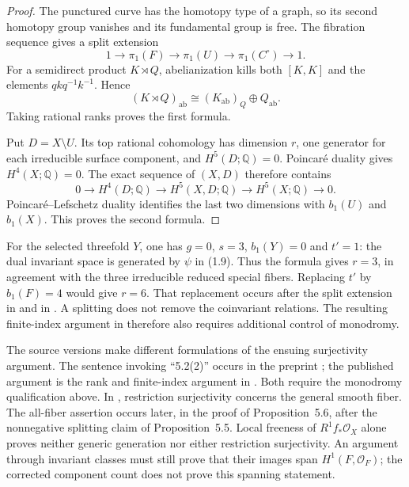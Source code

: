 \documentclass[11pt]{article}
\numberwithin{equation}{section}
\begin{document}
\begin{proof}
The punctured curve has the homotopy type of a graph, so its second
homotopy group vanishes and its fundamental group is free. The
fibration sequence gives a split extension
\[
 1\longrightarrow\pi_1(F)\longrightarrow\pi_1(U)
 \longrightarrow\pi_1(C^\circ)\longrightarrow1.
\]
For a semidirect product $K\rtimes Q$, abelianization kills both
$[K,K]$ and the elements $qkq^{-1}k^{-1}$. Hence
\[
 (K\rtimes Q)_{\mathrm{ab}}
   \cong (K_{\mathrm{ab}})_Q\oplus Q_{\mathrm{ab}}.
\]
Taking rational ranks proves the first formula.

Put $D=X\setminus U$. Its top rational cohomology has dimension
$r$, one generator for each irreducible surface component, and
$H^5(D;\mathbb Q)=0$. Poincar\'e duality gives $H^4(X;\mathbb Q)=0$.
The exact sequence of $(X,D)$ therefore contains
\[
 0\longrightarrow H^4(D;\mathbb Q)
 \longrightarrow H^5(X,D;\mathbb Q)
 \longrightarrow H^5(X;\mathbb Q)\longrightarrow0.
\]
Poincar\'e--Lefschetz duality identifies the last two dimensions with
$b_1(U)$ and $b_1(X)$. This proves the second formula.
\end{proof}

For the selected threefold $Y$, one has $g=0$, $s=3$, $b_1(Y)=0$
and $t'=1$: the dual invariant space is generated by $\psi$ in
(1.9). Thus the formula gives $r=3$, in agreement with the three
irreducible reduced special fibers. Replacing $t'$ by
$b_1(F)=4$ would give $r=6$. That replacement occurs after the
split extension in \cite[Lemma~3.2, pp.~84--85]{CDP1998} and in
\cite[Lemma~4.2, p.~684]{CDP2020}. A splitting does not remove the
coinvariant relations. The resulting finite-index argument in
\cite[proof of Theorem~3.1, p.~86]{CDP1998} therefore also requires
additional control of monodromy.

The source versions make different formulations of the ensuing
surjectivity argument. The sentence invoking ``5.2(2)'' occurs
in the preprint \cite[p.~13]{CDP1996}; the published argument is
the rank and finite-index argument in \cite[p.~86]{CDP1998}.
Both require the monodromy qualification above.
In \cite[Corollary~5.2]{CDP2020}, restriction surjectivity concerns
the general smooth fiber. The all-fiber assertion occurs later,
in the proof of Proposition~5.6, after the nonnegative splitting
claim of Proposition~5.5. Local freeness of $R^1f_*\mathcal O_X$
alone proves neither generic generation nor either restriction
surjectivity. An argument through invariant classes must still
prove that their images span $H^1(F,\mathcal O_F)$; the corrected
component count does not prove this spanning statement.
\end{document}
